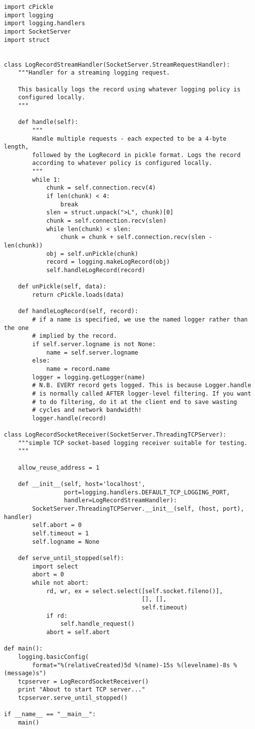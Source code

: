 \begin{verbatim}
import cPickle
import logging
import logging.handlers
import SocketServer
import struct


class LogRecordStreamHandler(SocketServer.StreamRequestHandler):
    """Handler for a streaming logging request.

    This basically logs the record using whatever logging policy is
    configured locally.
    """

    def handle(self):
        """
        Handle multiple requests - each expected to be a 4-byte length,
        followed by the LogRecord in pickle format. Logs the record
        according to whatever policy is configured locally.
        """
        while 1:
            chunk = self.connection.recv(4)
            if len(chunk) < 4:
                break
            slen = struct.unpack(">L", chunk)[0]
            chunk = self.connection.recv(slen)
            while len(chunk) < slen:
                chunk = chunk + self.connection.recv(slen - len(chunk))
            obj = self.unPickle(chunk)
            record = logging.makeLogRecord(obj)
            self.handleLogRecord(record)

    def unPickle(self, data):
        return cPickle.loads(data)

    def handleLogRecord(self, record):
        # if a name is specified, we use the named logger rather than the one
        # implied by the record.
        if self.server.logname is not None:
            name = self.server.logname
        else:
            name = record.name
        logger = logging.getLogger(name)
        # N.B. EVERY record gets logged. This is because Logger.handle
        # is normally called AFTER logger-level filtering. If you want
        # to do filtering, do it at the client end to save wasting
        # cycles and network bandwidth!
        logger.handle(record)

class LogRecordSocketReceiver(SocketServer.ThreadingTCPServer):
    """simple TCP socket-based logging receiver suitable for testing.
    """

    allow_reuse_address = 1

    def __init__(self, host='localhost',
                 port=logging.handlers.DEFAULT_TCP_LOGGING_PORT,
                 handler=LogRecordStreamHandler):
        SocketServer.ThreadingTCPServer.__init__(self, (host, port), handler)
        self.abort = 0
        self.timeout = 1
        self.logname = None

    def serve_until_stopped(self):
        import select
        abort = 0
        while not abort:
            rd, wr, ex = select.select([self.socket.fileno()],
                                       [], [],
                                       self.timeout)
            if rd:
                self.handle_request()
            abort = self.abort

def main():
    logging.basicConfig(
        format="%(relativeCreated)5d %(name)-15s %(levelname)-8s %(message)s")
    tcpserver = LogRecordSocketReceiver()
    print "About to start TCP server..."
    tcpserver.serve_until_stopped()

if __name__ == "__main__":
    main()
\end{verbatim}

